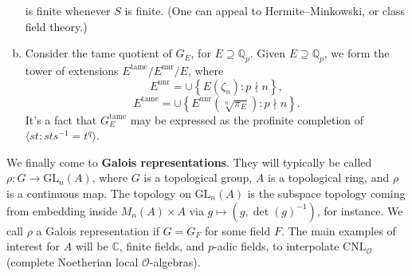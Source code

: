 \documentclass[reqno]{amsart} 
\numberwithin{theorem}{section}
\numberwithin{equation}{section}
\numberwithin{exercise}{section}
\begin{document}
\begin{example}
\begin{enumerate}[(a)]
    is finite whenever $S$ is finite.  (One can appeal to Hermite--Minkowski, or class field theory.)
  \item\label{enumerate:cq6r3g5bmp} Consider the tame quotient of $G_E$, for $E \supseteq \mathbb{Q}_p$.  Given $E \supseteq \mathbb{Q}_p$, we form the tower of extensions $E^{\mathrm{tame}} / E^{\mathrm{unr}} / E$, where
    \begin{equation*}
      E^{\mathrm{unr}} = \cup \left\{ E(\zeta_n) : p \nmid n \right\},
    \end{equation*}
    \begin{equation*}
      E^{\mathrm{tame}} = \cup \left\{ E^{\mathrm{unr}}(\sqrt[n]{\pi_E}) : p \nmid n \right\}.
    \end{equation*}
    It's a fact that $G_E^{\mathrm{tame}}$ may be expressed as the profinite completion of $\langle s t : s t s^{-1} = t^q \rangle$.
  \end{enumerate}
\end{example}
We finally come to \textbf{Galois representations}.  They will typically be called $\rho : G \rightarrow \mathrm{GL}_n(A)$, where $G$ is a topological group, $A$ is a topological ring, and $\rho$ is a continuous map.  The topology on $\mathrm{GL}_n(A)$ is the subspace topology coming from embedding inside $M_n(A) \times A$ via $g \mapsto(g, \det(g)^{-1})$, for instance.  We call $\rho$ a Galois representation if $G = G_F$ for some field $F$.  The main examples of interest for $A$ will be $\mathbb{C}$, finite fields, and $p$-adic fields, to interpolate $\mathrm{C N L}_{\mathcal{O}}$ (complete Noetherian local $\mathcal{O}$-algebras).
\end{document}
